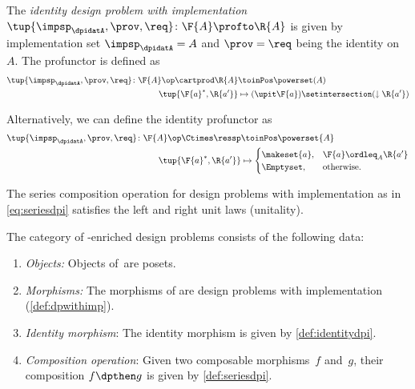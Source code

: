 {    \begin{definition}
        \label{def:identitydpi}
        The \emph{identity design problem with implementation}~$\tup{\impsp_{\dpidatA},\prov,\req} \colon \F{A} \profto \R{A}$ is given by implementation set $\impsp_{\dpidatA} = A$ and $\prov=\req$ being the identity on $A$.
        The profunctor is defined as
        \begin{align}
            \tup{\impsp_{\dpidatA},\prov,\req} \colon \F{A}\op \cartprod \R{A} & \toinPos \powerset(A) \\
            \tup{\F{a}^*,\R{a'}}                                              & \mapsto (\upit \F{a}) \setintersection (\downarrow \R{a'})
        \end{align}
    \end{definition}
    \begin{remark}
        Alternatively, we can define the identity profunctor as
        \begin{align}
            \tup{\impsp_{\dpidatA},\prov,\req}\colon \F{A}\op \Ctimes \ressp & \toinPos \powerset{A} \\
            \tup{\F{a}^*,\R{a'}}                                            & \mapsto
            \begin{cases}
                \makeset{a}, & \F{a}\ordleq_A \R{a'} \\
                \Emptyset,   & \text{otherwise}.
            \end{cases}
        \end{align}
    \end{remark}

    \begin{lemma}
        The series composition operation for design problems with implementation as in \cref{eq:seriesdpi} satisfies the left and right unit laws (unitality).
    \end{lemma}


    \begin{definition}
        The category of \Set-enriched design problems \DPI consists of the following data:
        \begin{enumerate}
            \item \emph{Objects:}
                  Objects of~\DPI are posets.
            \item \emph{Morphisms:}
                  The morphisms of \DPI are design problems with implementation (\cref{def:dpwithimp}).
            \item \emph{Identity morphism}: The identity morphism is given by \cref{def:identitydpi}.
            \item \emph{Composition operation}: Given two composable morphisms~$f$ and~$g$, their composition $f\dpthen g$ is given by \cref{def:seriesdpi}.
        \end{enumerate}
    \end{definition}

}
